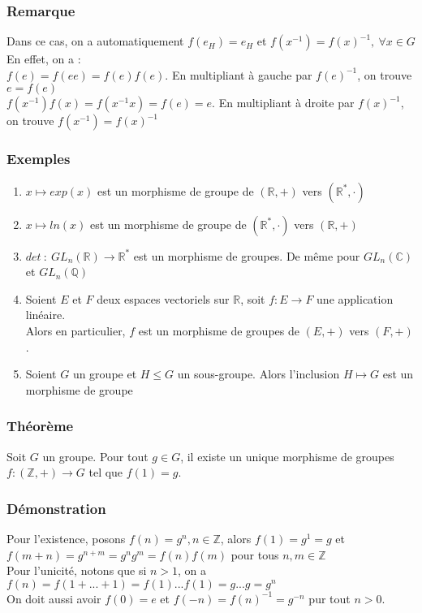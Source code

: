 \documentclass[a4paper, oneside]{report}
\newcommand{\R}{\mathbb{R}}
\newcommand{\C}{\mathbb{C}}
\newcommand{\Z}{\mathbb{Z}}
\newcommand{\Q}{\mathbb{Q}}
\newcommand{\mdg}{morphisme de groupes }
\begin{document}
\subsubsection{Remarque}
Dans ce cas, on a automatiquement $f(e_H)=e_H$ et $f(x^{-1})= f(x)^{-1},~\forall x\in G$\\
En effet, on a :\\
$f(e)=f(ee)=f(e)f(e)$. En multipliant à gauche par $f(e)^{-1}$, on trouve $e=f(e)$\\
$f(x^{-1})f(x)=f(x^{-1}x)=f(e)=e$. En multipliant à droite par $f(x)^{-1}$, on trouve $f(x^{-1})=f(x)^{-1}$\\

\subsubsection{Exemples}
\begin{enumerate}
\item $x\mapsto exp(x)$ est un morphisme de groupe de $(\R,+)$ vers $(\R^*, \cdot)$
\item $x\mapsto ln(x)$ est un morphisme de groupe de $(\R^*, \cdot)$ vers $(\R,+)$
\item $det~:~GL_n(\R)\rightarrow \R^*$ est un morphisme de groupes. De même pour $GL_n(\C)$ et $GL_n(\Q)$
\item Soient $E$ et $F$ deux espaces vectoriels sur $\R$, soit $f:E\rightarrow F$ une application linéaire.\\
Alors en particulier, $f$ est un morphisme de groupes de $(E,+)$ vers $(F,+)$.
\item Soient $G$ un groupe et $H\leq G$ un sous-groupe. Alors l'inclusion $H\mapsto G$ est un morphisme de groupe
\end{enumerate}

\subsubsection{Théorème}
Soit $G$ un groupe. Pour tout $g\in G$, il existe un unique \mdg $f:(\Z,+)\rightarrow G$ tel que $f(1)=g$.

\subsubsection{Démonstration}
Pour l'existence, posons $f(n)=g^n, n\in \Z$, alors $f(1)=g^1=g$ et $f(m+n)=g^{n+m}=g^ng^m=f(n)f(m)$ pour tous $n,m\in \Z$\\
Pour l'unicité, notons que si $n>1$, on a $f(n)= f(1+...+1)=f(1)...f(1)=g...g=g^n$\\
On doit aussi avoir $f(0)=e$ et $f(-n)=f(n)^{-1}=g^{-n}$ pur tout $n>0$.
\end{document}
